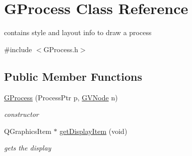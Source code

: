 \hypertarget{class_g_process}{\section{\-G\-Process \-Class \-Reference}
\label{class_g_process}
}


contains style and layout info to draw a process  




{\ttfamily \#include $<$\-G\-Process.\-h$>$}

\subsection*{\-Public \-Member \-Functions}
\begin{DoxyCompactItemize}
\item 
\hyperlink{class_g_process_a16ff7286ec7b0081a6d2a25f9784460f}{\-G\-Process} (\-Process\-Ptr p, \hyperlink{struct_g_v_node}{\-G\-V\-Node} n)
\begin{DoxyCompactList}\small\item\em constructor \end{DoxyCompactList}\item 
\-Q\-Graphics\-Item $\ast$ \hyperlink{class_g_process_abc8cdf8bb0a8402a1b507005be3a97f9}{get\-Display\-Item} (void)
\begin{DoxyCompactList}\small\item\em gets the display \end{DoxyCompactList}\end{DoxyCompactItemize}
